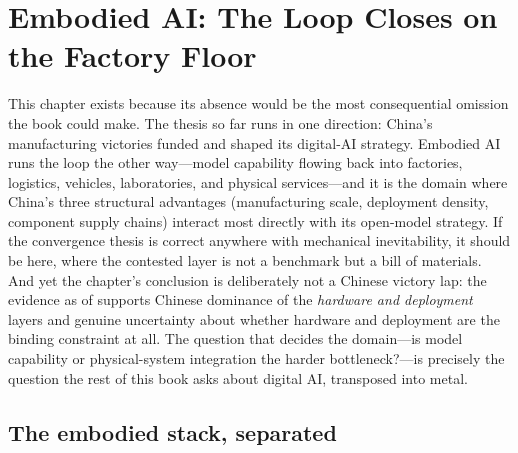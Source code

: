 \chapter[Embodied AI: The Loop Closes on the Factory Floor]{Embodied AI: The Loop Closes on the Factory Floor}
\label{ch:embodied}

This chapter exists because its absence would be the most consequential omission the book could make. The thesis so far runs in one direction: China's manufacturing victories funded and shaped its digital-AI strategy. Embodied AI runs the loop the other way---model capability flowing back into factories, logistics, vehicles, laboratories, and physical services---and it is the domain where China's three structural advantages (manufacturing scale, deployment density, component supply chains) interact most directly with its open-model strategy. If the convergence thesis is correct anywhere with mechanical inevitability, it should be here, where the contested layer is not a benchmark but a bill of materials. And yet the chapter's conclusion is deliberately not a Chinese victory lap: the evidence as of \datafreeze supports Chinese dominance of the \emph{hardware and deployment} layers and genuine uncertainty about whether hardware and deployment are the binding constraint at all. The question that decides the domain---is model capability or physical-system integration the harder bottleneck?---is precisely the question the rest of this book asks about digital AI, transposed into metal.

\section{The embodied stack, separated}
\label{sec:embodied-stack}

